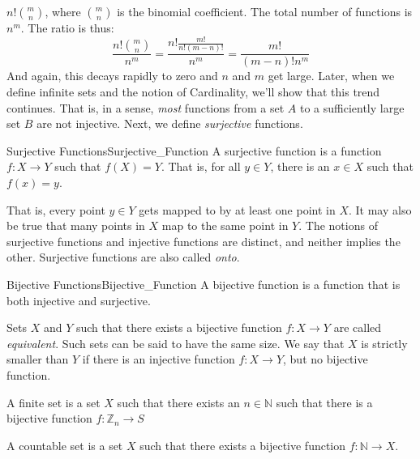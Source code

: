         $n!\binom{m}{n}$, where $\binom{m}{n}$ is the
        binomial coefficient. The total number of functions
        is $n^{m}$. The ratio is thus:
        \begin{equation}
            \frac{n!\binom{m}{n}}{n^{m}}=\frac{n!\frac{m!}{n!(m-n)!}}{n^{m}}
                                        =\frac{m!}{(m-n)!n^{m}}
        \end{equation}
        And again, this decays rapidly to zero and $n$ and $m$
        get large. Later, when we define infinite sets
        and the notion of Cardinality, we'll show that this
        trend continues. That is, in a sense, \textit{most}
        functions from a set $A$ to a sufficiently large set
        $B$ are not injective. Next, we define
        \textit{surjective} functions.
        \begin{ldefinition}{Surjective Functions}{Surjective_Function}
            A \gls{surjective function} is a function
            $f:X\rightarrow{Y}$ such that $f(X)=Y$.
            That is, for all $y\in{Y}$, there is an
            $x\in{X}$ such that $f(x)=y$.
        \end{ldefinition}
        That is, every point $y\in{Y}$ gets mapped to by
        at least one point in $X$. It may also be true that
        many points in $X$ map to the same point in $Y$.
        The notions of surjective functions and injective
        functions are distinct, and neither implies the
        other. Surjective functions are also called
        \textit{onto}.
        \begin{ldefinition}{Bijective Functions}{Bijective_Function}
            A \gls{bijective function} is a function
            that is both injective and surjective.
        \end{ldefinition}
        Sets $X$ and $Y$ such that there exists a bijective function
        $f:X\rightarrow{Y}$ are called \textit{equivalent}. Such sets can
        be said to have the same size. We say that $X$ is strictly
        smaller than $Y$ if there is an injective function
        $f:X\rightarrow{Y}$, but no bijective function.
        \begin{definition}
            A finite set is a set $X$ such that there exists an
            $n\in\mathbb{N}$ such that there is a bijective function
            $f:\mathbb{Z}_{n}\rightarrow{S}$
        \end{definition}
        \begin{definition}
            A countable set is a set $X$ such that there exists a
            bijective function $f:\mathbb{N}\rightarrow{X}$.
        \end{definition}
